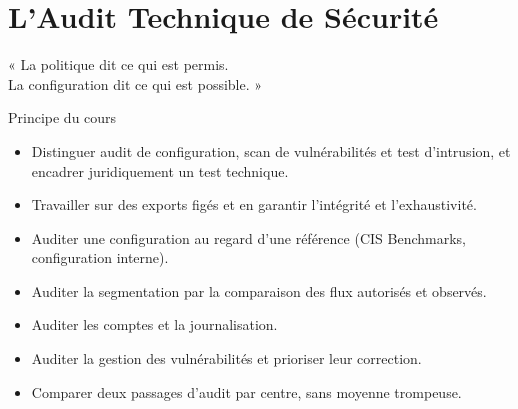 
\chapter{L'Audit Technique de Sécurité}
\label{chap:audit-technique}

\epigraph{%
    « La politique dit ce qui est permis.\\
    La configuration dit ce qui est possible. »%
}{Principe du cours}


\begin{boxobjectifs}
\begin{itemize}
    \item Distinguer audit de configuration, scan de vulnérabilités et test
          d'intrusion, et encadrer juridiquement un test technique.
    \item Travailler sur des exports figés et en garantir l'intégrité et
          l'exhaustivité.
    \item Auditer une configuration au regard d'une référence (CIS
          Benchmarks, configuration interne).
    \item Auditer la segmentation par la comparaison des flux autorisés et
          observés.
    \item Auditer les comptes et la journalisation.
    \item Auditer la gestion des vulnérabilités et prioriser leur
          correction.
    \item Comparer deux passages d'audit par centre, sans moyenne
          trompeuse.
\end{itemize}
\end{boxobjectifs}

